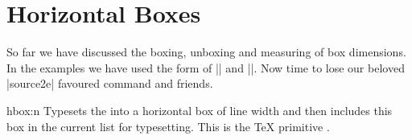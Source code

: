 
\section{Horizontal Boxes}
\label{l3:hboxes}

So far we have discussed the boxing, unboxing and measuring of box dimensions. In the examples we have used
the  form of |\hbox| and |\vbox|.  Now time to lose our  beloved |source2e| favoured command  and friends. 

 \begin{docCommand}{hbox:n}{ }
   Typesets the  into a horizontal box of line width and then includes this box in the current list for typesetting.
   This is the \TeX{} primitive .
 \end{docCommand}


